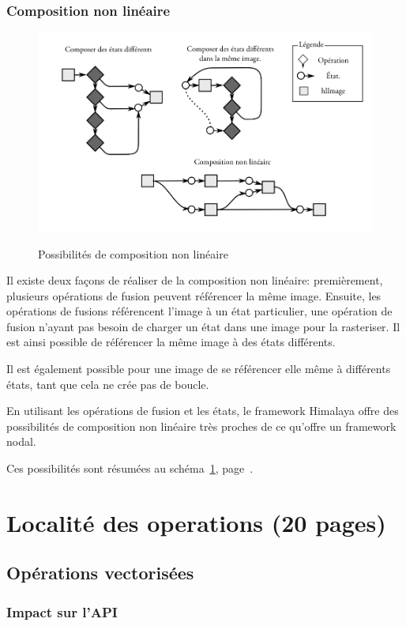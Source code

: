 		\subsection{Composition non linéaire}
		\begin{figure}[ht]
			\centering
			\includegraphics[width=\textwidth]{images/compnonlin} 
			\label{fig:compnonlin}
			\caption{Possibilités de composition non linéaire}
		\end{figure}
			Il existe deux façons de réaliser de la composition non linéaire: premièrement, plusieurs opérations de fusion peuvent référencer 
			la même image. Ensuite, les opérations de fusions référencent l'image à un état particulier, une opération de fusion n'ayant pas
			besoin de charger un état dans une image pour la rasteriser. Il est ainsi possible de référencer la même image à des états différents.

			Il est également possible pour une image de se référencer elle même à différents états, tant que cela ne crée pas de boucle. 

			En utilisant les opérations de fusion et les états, le framework Himalaya offre des possibilités de composition non linéaire très
			proches de ce qu'offre un framework nodal. 

			Ces possibilités sont résumées au schéma~\ref{fig:compnonlin}, page~\pageref{fig:compnonlin}.

\chapter{Localité des operations (20 pages)}
	\section{Opérations vectorisées}
		\subsection{Impact sur l'API}
